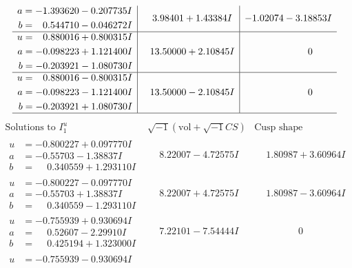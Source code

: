 \documentclass[1p]{elsarticle_modified}
\theoremstyle{definition}
\newcommand{\I}{\sqrt{-1}}
\begin{document}
$$\begin{array}{c|c|c}
\begin{aligned}
a &= -1.393620 - 0.207735 I \\
b &= \phantom{-}0.544710 - 0.046272 I\end{aligned}
 & \phantom{-}3.98401 + 1.43384 I & -1.02074 - 3.18853 I \\ \hline\begin{aligned}
u &= \phantom{-}0.880016 + 0.800315 I \\
a &= -0.098223 + 1.121400 I \\
b &= -0.203921 - 1.080730 I\end{aligned}
 & \phantom{-}13.50000 + 2.10845 I & \phantom{-0.000000 } 0 \\ \hline\begin{aligned}
u &= \phantom{-}0.880016 - 0.800315 I \\
a &= -0.098223 - 1.121400 I \\
b &= -0.203921 + 1.080730 I\end{aligned}
 & \phantom{-}13.50000 - 2.10845 I & \phantom{-0.000000 } 0\\
 \hline 
 \end{array}$$\newpage$$\begin{array}{c|c|c}  
\text{Solutions to }I^u_{1}& \I (\text{vol} + \sqrt{-1}CS) & \text{Cusp shape}\\
 \hline 
\begin{aligned}
u &= -0.800227 + 0.097770 I \\
a &= -0.55703 - 1.38837 I \\
b &= \phantom{-}0.340559 + 1.293110 I\end{aligned}
 & \phantom{-}8.22007 - 4.72575 I & \phantom{-}1.80987 + 3.60964 I \\ \hline\begin{aligned}
u &= -0.800227 - 0.097770 I \\
a &= -0.55703 + 1.38837 I \\
b &= \phantom{-}0.340559 - 1.293110 I\end{aligned}
 & \phantom{-}8.22007 + 4.72575 I & \phantom{-}1.80987 - 3.60964 I \\ \hline\begin{aligned}
u &= -0.755939 + 0.930694 I \\
a &= \phantom{-}0.52607 - 2.29910 I \\
b &= \phantom{-}0.425194 + 1.323000 I\end{aligned}
 & \phantom{-}7.22101 - 7.54444 I & \phantom{-0.000000 } 0 \\ \hline\begin{aligned}
u &= -0.755939 - 0.930694 I \\

\end{aligned}
\end{array}$$
\end{document}
